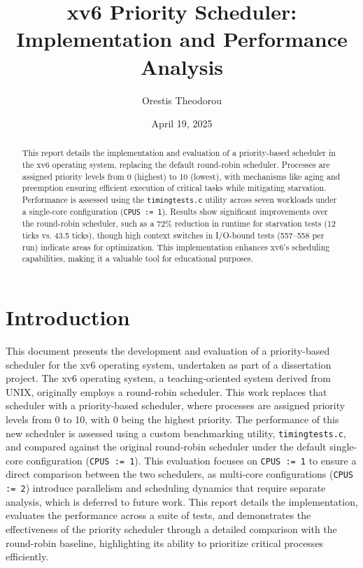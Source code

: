 \documentclass{article}
\title{xv6 Priority Scheduler: Implementation and Performance Analysis}
\author{Orestis Theodorou}
\date{April 19, 2025}
\begin{document}
\maketitle

\begin{abstract}
This report details the implementation and evaluation of a priority-based scheduler in the xv6 operating system, replacing the default round-robin scheduler. Processes are assigned priority levels from 0 (highest) to 10 (lowest), with mechanisms like aging and preemption ensuring efficient execution of critical tasks while mitigating starvation. Performance is assessed using the \texttt{timingtests.c} utility across seven workloads under a single-core configuration (\texttt{CPUS := 1}). Results show significant improvements over the round-robin scheduler, such as a 72\% reduction in runtime for starvation tests (12 ticks vs. 43.5 ticks), though high context switches in I/O-bound tests (557--558 per run) indicate areas for optimization. This implementation enhances xv6’s scheduling capabilities, making it a valuable tool for educational purposes.
\end{abstract}

\section{Introduction}
This document presents the development and evaluation of a priority-based scheduler for the xv6 operating system, undertaken as part of a dissertation project. The xv6 operating system, a teaching-oriented system derived from UNIX, originally employs a round-robin scheduler. This work replaces that scheduler with a priority-based scheduler, where processes are assigned priority levels from 0 to 10, with 0 being the highest priority. The performance of this new scheduler is assessed using a custom benchmarking utility, \texttt{timingtests.c}, and compared against the original round-robin scheduler under the default single-core configuration (\texttt{CPUS := 1}). This evaluation focuses on \texttt{CPUS := 1} to ensure a direct comparison between the two schedulers, as multi-core configurations (\texttt{CPUS := 2}) introduce parallelism and scheduling dynamics that require separate analysis, which is deferred to future work. This report details the implementation, evaluates the performance across a suite of tests, and demonstrates the effectiveness of the priority scheduler through a detailed comparison with the round-robin baseline, highlighting its ability to prioritize critical processes efficiently.
\end{document}
